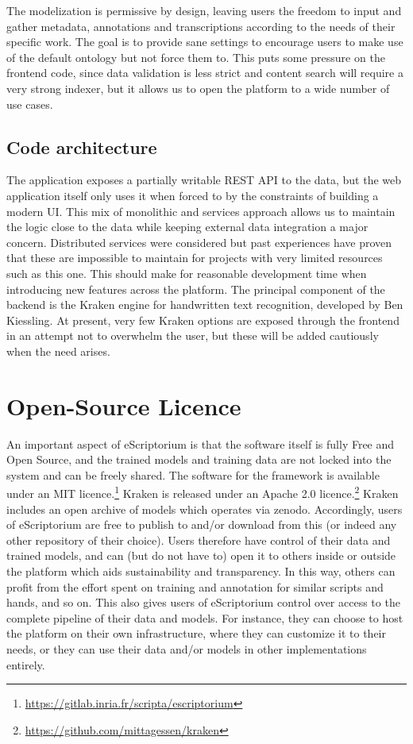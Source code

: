 The modelization is permissive by design, leaving users the freedom to input
and gather metadata, annotations and transcriptions according to the needs of
their specific work.  The goal is to provide sane settings to encourage users
to make use of the default ontology but not force them to. This puts some
pressure on the frontend code, since data validation is less strict and content
search will require a very strong indexer, but it allows us to open the
platform to a wide number of use cases.

\subsection{Code architecture}

The application exposes a partially writable REST API to the data, but the web
application itself only uses it when forced to by the constraints of building a
modern UI. This mix of monolithic and services approach allows us to maintain
the logic close to the data while keeping external data integration a major
concern. Distributed services were considered but past experiences have proven
that these are impossible to maintain for projects with very limited resources
such as this one. This should make for reasonable development time when
introducing new features across the platform. The principal component of the
backend is the Kraken engine for handwritten text recognition, developed by Ben
Kiessling. At present, very few Kraken options are exposed through the frontend
in an attempt not to overwhelm the user, but these will be added cautiously
when the need arises.

\section{Open-Source Licence}

An important aspect of eScriptorium is that the software itself is fully Free
and Open Source, and the trained models and training data are not locked into
the system and can be freely shared. The software for the framework is
available under an MIT
licence.\footnote{\url{https://gitlab.inria.fr/scripta/escriptorium}} Kraken is
released under an Apache 2.0
licence.\footnote{\url{https://github.com/mittagessen/kraken}} Kraken includes
an open archive of models which operates via zenodo. Accordingly, users of
eScriptorium are free to publish to and/or download from this (or indeed any
other repository of their choice). Users therefore have control of their data
and trained models, and can (but do not have to) open it to others inside or
outside the platform which aids sustainability and transparency. In this way,
others can profit from the effort spent on training and annotation for similar
scripts and hands, and so on. This also gives users of eScriptorium control
over access to the complete pipeline of their data and models. For instance,
they can choose to host the platform on their own infrastructure, where they
can customize it to their needs, or they can use their data and/or models in
other implementations entirely.

